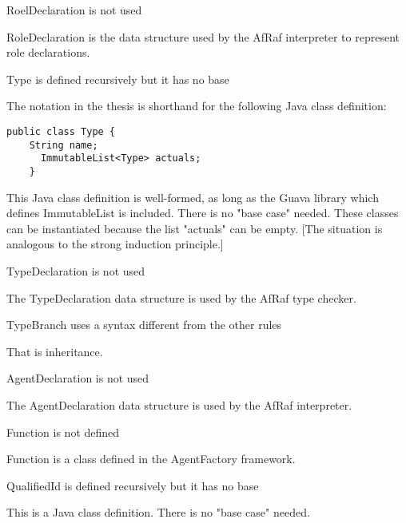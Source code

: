 \documentclass{article}
\newenvironment{them}{\noindent\begingroup\color{blue}}{\endgroup\par}
\begin{document}
\begin{them}

RoelDeclaration is not used 

\end{them}
RoleDeclaration is the data structure used by the AfRaf interpreter to
represent role declarations.

\begin{them}

Type is defined recursively but it has no base 

\end{them}
The notation in the thesis is shorthand for the following Java class definition:
\begin{verbatim}
public class Type {
    String name;
      ImmutableList<Type> actuals;
    }
\end{verbatim}

This Java class definition is well-formed, as long as the Guava library which
defines ImmutableList is included. There is no "base case" needed. These
classes can be instantiated because the list "actuals" can be empty. [The
situation is analogous to the strong induction principle.]

\begin{them}

TypeDeclaration is not used 

\end{them}
The TypeDeclaration data structure is used by the AfRaf type checker.

\begin{them}

TypeBranch uses a syntax different from the other rules 

\end{them}
That is inheritance. 

\begin{them}

AgentDeclaration is not used 

\end{them}
The AgentDeclaration data structure is used by the AfRaf interpreter.

\begin{them}

Function is not defined 

\end{them}
Function is a class defined in the AgentFactory framework.

\begin{them}

QualifiedId is defined recursively but it has no base

\end{them}
This is a Java class definition. There is no "base case" needed.
\end{document}
